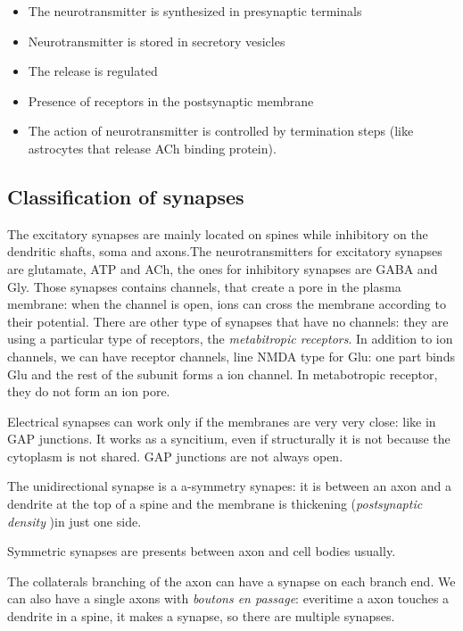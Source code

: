 \documentclass[a4paper, 12pt]{book}
\begin{document}
\begin{itemize}
\item{The neurotransmitter is synthesized in presynaptic terminals}
\item{Neurotransmitter is stored in secretory vesicles}
\item{The release is regulated}
\item{Presence of receptors in the postsynaptic membrane}
\item{The action of neurotransmitter is controlled by termination steps (like astrocytes that release ACh binding protein).}
\end{itemize}

\subsection{Classification of synapses}
The excitatory synapses are mainly located on spines while inhibitory on the dendritic shafts, soma and axons.The neurotransmitters for excitatory synapses are glutamate, ATP and ACh, the ones for inhibitory synapses are GABA and Gly. Those synapses contains channels, that create a pore in the plasma membrane: when the channel is open, ions can cross the membrane according to their potential. There are other type of synapses that have no channels: they are using a particular type of receptors, the \emph{metabitropic receptors}. In addition to ion channels, we can have receptor channels, line NMDA type for Glu: one part binds Glu and the rest of the subunit forms a ion channel. In metabotropic receptor, they do not form an ion pore.

Electrical synapses can work only if the membranes are very very close: like in GAP junctions. It works as a syncitium, even if structurally it is not because the cytoplasm is not shared.
 GAP junctions are not always open.
 
The unidirectional synapse is a a-symmetry synapes: it is between an axon and a dendrite at the top of a spine and the membrane is thickening (\emph{postsynaptic density} )in just one side. 

Symmetric synapses are presents between axon and cell bodies usually.

The collaterals branching of the axon can have a synapse on each branch end. We can also have a single axons with \emph{boutons en passage}: everitime a axon touches a dendrite in a spine, it makes a synapse, so there are multiple synapses.
\end{document}
